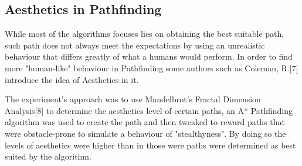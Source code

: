 \subsection{Aesthetics in Pathfinding}

While most of the algorithms focuses lies on obtaining the best suitable path, such path does not always meet the expectations by using an unrealistic behaviour that differs greatly of what a humans would perform. In order to find more "human-like" behaviour in Pathfinding some authors such as Coleman, R.[7] introduce the idea of Aesthetics in it.

\vspace{2mm} 
The experiment's approach was to use Mandelbrot's Fractal Dimension Analysis[8] to determine the aesthetics level of certain paths, an A* Pathfinding algorithm was used to create the path and then tweaked to reward paths that were obstacle-prone to simulate a behaviour of "stealthyness". By doing so the levels of aesthetics were higher than in those were paths were determined as best suited by the algorithm.   